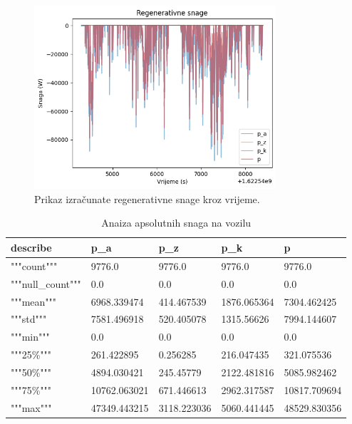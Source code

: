 \begin{figure}
    \centering
    \includegraphics[width=0.8\textwidth]{images/regen_powers.png}
    \caption{Prikaz izračunate regenerativne snage kroz vrijeme.}
    \label{fig:e:regen_power_graph}
\end{figure}


\begin{table}[!ht]
    \centering
    \caption{Anaiza apsolutnih snaga na vozilu}
    \begin{tabular}{lllll}
    \hline
        \textbf{describe} & \textbf{p\_a} & \textbf{p\_z} & \textbf{p\_k} & \textbf{p} \\ \hline
        """count""" & 9776.0 & 9776.0 & 9776.0 & 9776.0 \\ 
        """null\_count""" & 0.0 & 0.0 & 0.0 & 0.0 \\ 
        """mean""" & 6968.339474 & 414.467539 & 1876.065364 & 7304.462425 \\ 
        """std""" & 7581.496918 & 520.405078 & 1315.56626 & 7994.144607 \\ 
        """min""" & 0.0 & 0.0 & 0.0 & 0.0 \\ 
        """25\%""" & 261.422895 & 0.256285 & 216.047435 & 321.075536 \\ 
        """50\%""" & 4894.030421 & 245.45779 & 2122.481816 & 5085.982462 \\ 
        """75\%""" & 10762.063021 & 671.446613 & 2962.317587 & 10817.709694 \\ 
        """max""" & 47349.443215 & 3118.223036 & 5060.441445 & 48529.830356 \\ \hline
    \end{tabular}
    \label{table:c:abs_powers}
\end{table}

